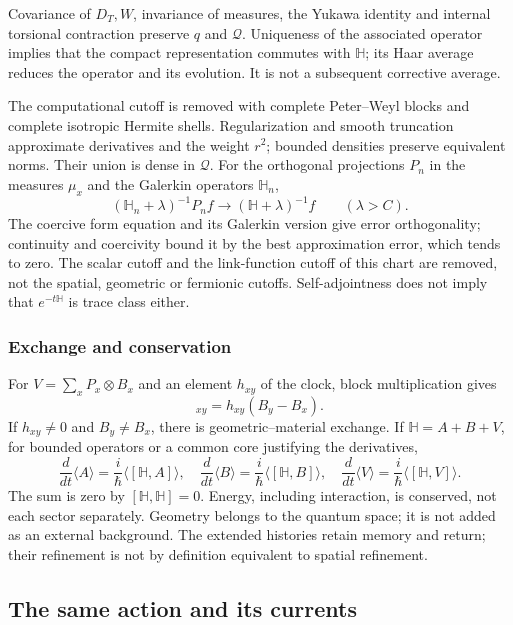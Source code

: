 Covariance of $D_T,W$, invariance of measures, the Yukawa identity and internal torsional contraction preserve $q$ and $\mathcal Q$. Uniqueness of the associated operator implies that the compact representation commutes with $\mathbb H$; its Haar average reduces the operator and its evolution. It is not a subsequent corrective average.

The computational cutoff is removed with complete Peter--Weyl blocks and complete isotropic Hermite shells. Regularization and smooth truncation approximate derivatives and the weight $r^2$; bounded densities preserve equivalent norms. Their union is dense in $\mathcal Q$. For the orthogonal projections $P_n$ in the measures $\mu_x$ and the Galerkin operators $\mathbb H_n$,
\[
(\mathbb H_n+\lambda)^{-1}P_nf\longrightarrow
(\mathbb H+\lambda)^{-1}f\qquad(\lambda>C).
\]
The coercive form equation and its Galerkin version give error orthogonality; continuity and coercivity bound it by the best approximation error, which tends to zero. The scalar cutoff and the link-function cutoff of this chart are removed, not the spatial, geometric or fermionic cutoffs. Self-adjointness does not imply that $e^{-t\mathbb H}$ is trace class either.

\subsubsection{Exchange and conservation}
\label{hmtcuatro:gea:intercambio}

For $V=\sum_xP_x\otimes B_x$ and an element $h_{xy}$ of the clock, block multiplication gives
\begin{equation}
[H_{\rm clk}\otimes I,V]_{xy}=h_{xy}(B_y-B_x).
\label{hmtcuatro:gea:conmutador}
\end{equation}
If $h_{xy}\ne0$ and $B_y\ne B_x$, there is geometric--material exchange. If $\mathbb H=A+B+V$, for bounded operators or a common core justifying the derivatives,
\[
\frac d{dt}\langle A\rangle=\frac i\hbar\langle[\mathbb H,A]\rangle,
\quad
\frac d{dt}\langle B\rangle=\frac i\hbar\langle[\mathbb H,B]\rangle,
\quad
\frac d{dt}\langle V\rangle=\frac i\hbar\langle[\mathbb H,V]\rangle.
\]
The sum is zero by $[\mathbb H,\mathbb H]=0$. Energy, including interaction, is conserved, not each sector separately. Geometry belongs to the quantum space; it is not added as an external background. The extended histories retain memory and return; their refinement is not by definition equivalent to spatial refinement.

\subsection{The same action and its currents}
\label{hmtcuatro:gea:accion}

